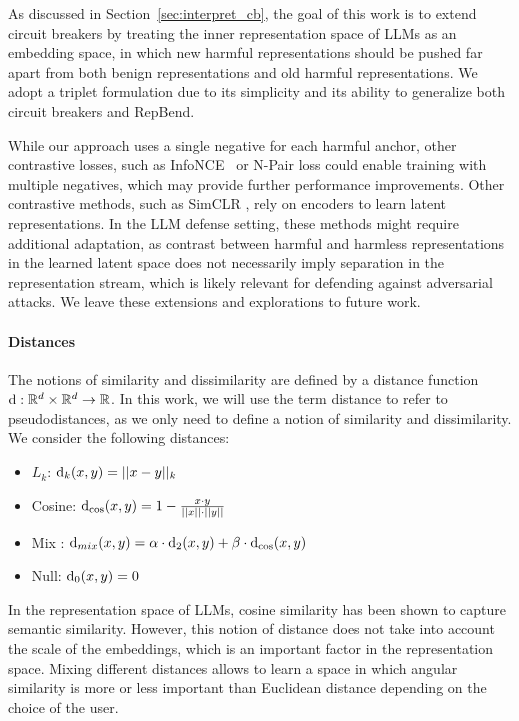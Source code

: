 \documentclass[11pt]{article}
\begin{document}
As discussed in Section~\ref{sec:interpret_cb}, the goal of this work is to extend circuit breakers by treating the inner representation space of LLMs as an embedding space, in which new harmful representations should be pushed far apart from both benign representations and old harmful representations.
We adopt a triplet formulation due to its simplicity and its ability to generalize both circuit breakers and RepBend.

While our approach uses a single negative for each harmful anchor, other contrastive losses, such as InfoNCE~\citep{oord2019representationlearningcontrastivepredictive} or N-Pair loss \citep{NIPS2016_6b180037} could enable training with multiple negatives, which may provide further performance improvements.
Other contrastive methods, such as SimCLR \citep{chen2020simpleframeworkcontrastivelearning}, rely on encoders to learn latent representations. In the LLM defense setting, these methods might require
additional adaptation, as contrast between harmful and harmless representations in the learned latent space does not necessarily imply separation in the representation stream, which is likely relevant for defending against adversarial attacks. We leave these extensions and explorations to future work.



\paragraph{Distances}
The notions of similarity and dissimilarity are defined by a distance function $\text{d}: \mathbb{R}^d \times \mathbb{R}^d \to \mathbb{R}$. In this work, we will use the term distance to refer to pseudodistances, as we only need to define a notion of similarity and dissimilarity.
We consider the following distances:
\begin{itemize}[nolistsep]
    \item $L_k$: $\text{d}_k(x, y) = ||x - y||_k$
    \item Cosine: $\text{d}_{\cos}(x, y) = 1 - \frac{x \cdot y}{||x|| \cdot ||y||}$
    \item Mix : $\text{d}_{mix}(x, y) = \alpha \cdot \text{d}_2(x, y) + \beta \cdot \text{d}_{\cos}(x, y)$
    \item Null: $\text{d}_0(x, y) = 0$
\end{itemize}
In the representation space of LLMs, cosine similarity has been shown to capture semantic similarity.
However, this notion of distance does not take into account the scale of the embeddings, which is an important factor in the representation space.
Mixing different distances allows to learn a space in which angular similarity is more or less important than Euclidean distance depending on the choice of the user.
\end{document}
